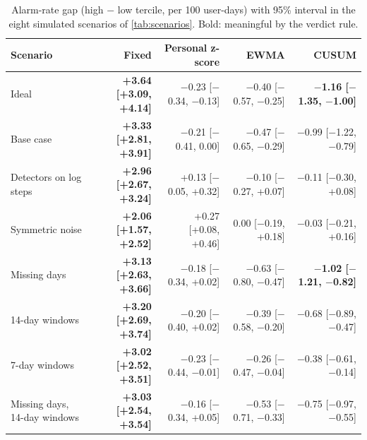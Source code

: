 \begin{table}[!htbp]
\centering
\scriptsize
\setlength{\tabcolsep}{3.0pt}
\caption{Alarm-rate gap (high $-$ low tercile, per 100 user-days) with 95\% interval in the eight simulated scenarios of \cref{tab:scenarios}. Bold: meaningful by the verdict rule.}
\label{tab:scenarios_ci}
\begin{tabular}{@{}p{3.0cm}rrrr@{}}
\toprule
Scenario & Fixed & Personal z-score & EWMA & CUSUM \\
\midrule
Ideal & \textbf{+3.64 [+3.09, +4.14]} & $-$0.23 [$-$0.34, $-$0.13] & $-$0.40 [$-$0.57, $-$0.25] & \textbf{$-$1.16 [$-$1.35, $-$1.00]} \\
Base case & \textbf{+3.33 [+2.81, +3.91]} & $-$0.21 [$-$0.41, 0.00] & $-$0.47 [$-$0.65, $-$0.29] & $-$0.99 [$-$1.22, $-$0.79] \\
Detectors on log steps & \textbf{+2.96 [+2.67, +3.24]} & +0.13 [$-$0.05, +0.32] & $-$0.10 [$-$0.27, +0.07] & $-$0.11 [$-$0.30, +0.08] \\
Symmetric noise & \textbf{+2.06 [+1.57, +2.52]} & +0.27 [+0.08, +0.46] & 0.00 [$-$0.19, +0.18] & $-$0.03 [$-$0.21, +0.16] \\
Missing days & \textbf{+3.13 [+2.63, +3.66]} & $-$0.18 [$-$0.34, +0.02] & $-$0.63 [$-$0.80, $-$0.47] & \textbf{$-$1.02 [$-$1.21, $-$0.82]} \\
14-day windows & \textbf{+3.20 [+2.69, +3.74]} & $-$0.20 [$-$0.40, +0.02] & $-$0.39 [$-$0.58, $-$0.20] & $-$0.68 [$-$0.89, $-$0.47] \\
7-day windows & \textbf{+3.02 [+2.52, +3.51]} & $-$0.23 [$-$0.44, $-$0.01] & $-$0.26 [$-$0.47, $-$0.04] & $-$0.38 [$-$0.61, $-$0.14] \\
Missing days, 14-day windows & \textbf{+3.03 [+2.54, +3.54]} & $-$0.16 [$-$0.34, +0.05] & $-$0.53 [$-$0.71, $-$0.33] & $-$0.75 [$-$0.97, $-$0.55] \\
\bottomrule
\end{tabular}
\end{table}
